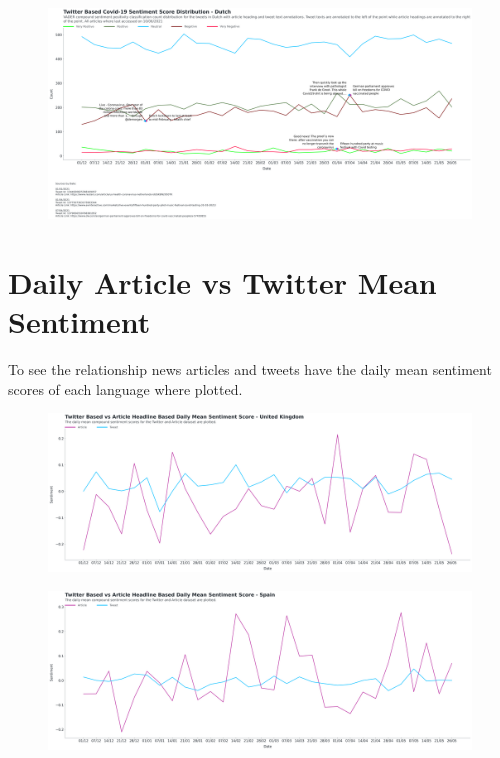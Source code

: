 \begin{landscape}
\begin{figure}[h!]
\includegraphics[scale=0.33]{Final Dutch Annotated Distribution.png}
\caption[Final Dutch Annotated Distribution]{ }
\label{fig:Dutch}
\end{figure}


\newpage

\section{Daily Article vs Twitter Mean Sentiment}

To see the relationship news articles and tweets have the daily mean sentiment scores of each language where plotted.

\begin{figure}[h!]
\includegraphics[scale=0.33]{Daily Mean Article VS Twitter UK.png}
\caption[Daily Mean Article VS Twitter]{ }
\label{fig:artcilevstwitteruk}
\end{figure}

\begin{figure}[h!]
\includegraphics[scale=0.33]{Daily Mean Article VS Twitter Spain.png}
\caption[Daily Mean Article VS Twitter]{ }
\label{fig:artcilevstwitteres}
\end{figure}


\end{landscape}
